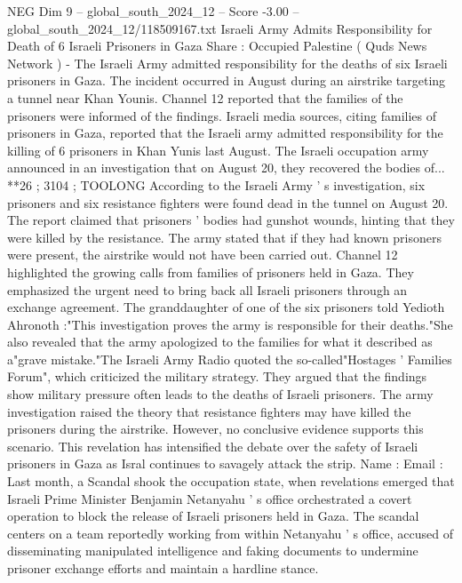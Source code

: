 \begin{textsample}{NEG Dim 9 – global\_south\_2024\_12 – Score -3.00 – global\_south\_2024\_12/118509167.txt}  \label{ex:f9_neg_132}
Israeli Army Admits Responsibility for Death of 6 Israeli Prisoners in Gaza Share : Occupied Palestine ( Quds News Network ) - The Israeli Army admitted responsibility for the deaths of six Israeli prisoners in Gaza.
The incident occurred in August during an airstrike targeting a tunnel near Khan Younis.
Channel 12 reported that the families of the prisoners were informed of the findings.
Israeli media sources, citing families of prisoners in Gaza, reported that the Israeli army admitted responsibility for the killing of 6 prisoners in Khan Yunis last August.
The Israeli occupation army announced in an investigation that on August 20, they recovered the bodies of... **26 ; 3104 ; TOOLONG According to the Israeli Army ' s investigation, six prisoners and six resistance fighters were found dead in the tunnel on August 20.
The report claimed that prisoners ' bodies had gunshot wounds, hinting that they were killed by the resistance.
The army stated that if they had known prisoners were present, the airstrike would not have been carried out.
Channel 12 highlighted the growing calls from families of prisoners held in Gaza.
They emphasized the urgent need to bring back all Israeli prisoners through an exchange agreement.
The granddaughter of one of the six prisoners told Yedioth Ahronoth :"This investigation proves the army is responsible for their deaths."She also revealed that the army apologized to the families for what it described as a"grave mistake."The Israeli Army Radio quoted the so-called"Hostages ' Families Forum", which criticized the military strategy.
They argued that the findings show military pressure often leads to the deaths of Israeli prisoners.
The army investigation raised the theory that resistance fighters may have killed the prisoners during the airstrike.
However, no conclusive evidence supports this scenario.
This revelation has intensified the debate over the safety of Israeli prisoners in Gaza as Isral continues to savagely attack the strip.
Name : Email : Last month, a Scandal shook the occupation state, when revelations emerged that Israeli Prime Minister Benjamin Netanyahu ' s office orchestrated a covert operation to block the release of Israeli prisoners held in Gaza.
The scandal centers on a team reportedly working from within Netanyahu ' s office, accused of disseminating manipulated intelligence and faking documents to undermine prisoner exchange efforts and maintain a hardline stance.

\end{textsample}
